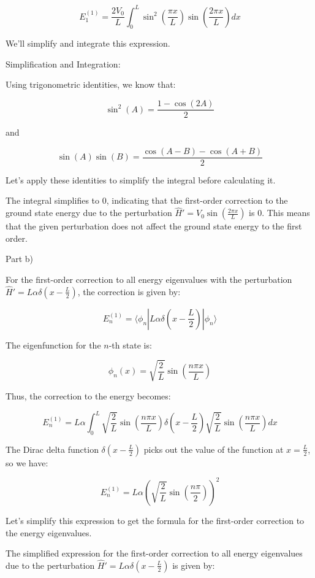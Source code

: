 \[ E_{1}^{(1)} = \frac{2V_{0}}{L} \int_{0}^{L} \sin^{2}\left(\frac{\pi x}{L}\right) \sin\left(\frac{2 \pi x}{L}\right) dx \]

We'll simplify and integrate this expression.

Simplification and Integration:

Using trigonometric identities, we know that:

\[ \sin^{2}(A) = \frac{1 - \cos(2A)}{2} \]

and

\[ \sin(A)\sin(B) = \frac{\cos(A-B) - \cos(A+B)}{2} \]

Let's apply these identities to simplify the integral before calculating it.

The integral simplifies to \(0\), indicating that the first-order correction to the ground state energy due to the perturbation \( \hat{H}' = V_{0} \sin\left(\frac{2 \pi x}{L} \right) \) is \(0\). This means that the given perturbation does not affect the ground state energy to the first order.

Part b)

For the first-order correction to all energy eigenvalues with the perturbation \( \hat{H}' = L\alpha \delta\left(x - \frac{L}{2} \right) \), the correction is given by:

\[ E_{n}^{(1)} = \langle \phi_{n} | L\alpha \delta\left(x - \frac{L}{2} \right) | \phi_{n} \rangle \]

The eigenfunction for the \( n \)-th state is:

\[ \phi_{n}(x) = \sqrt{\frac{2}{L}} \sin\left(\frac{n \pi x}{L} \right) \]

Thus, the correction to the energy becomes:

\[ E_{n}^{(1)} = L\alpha \int_{0}^{L} \sqrt{\frac{2}{L}} \sin\left(\frac{n \pi x}{L}\right) \delta\left(x - \frac{L}{2} \right) \sqrt{\frac{2}{L}} \sin\left(\frac{n \pi x}{L}\right) dx \]

The Dirac delta function \( \delta\left(x - \frac{L}{2} \right) \) picks out the value of the function at \( x = \frac{L}{2} \), so we have:

\[ E_{n}^{(1)} = L\alpha \left(\sqrt{\frac{2}{L}} \sin\left(\frac{n \pi}{2}\right)\right)^{2} \]

Let's simplify this expression to get the formula for the first-order correction to the energy eigenvalues.

The simplified expression for the first-order correction to all energy eigenvalues due to the perturbation \( \hat{H}' = L\alpha \delta\left(x - \frac{L}{2} \right) \) is given by:

